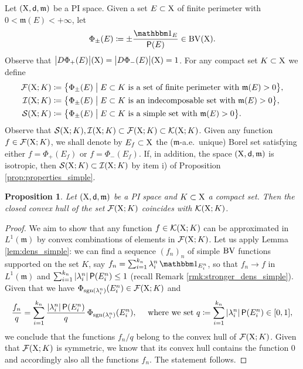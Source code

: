 \documentclass[reqno]{amsart}
\numberwithin{equation}{section}
\newcommand{\X}{{\rm X}}
\newcommand{\sfd}{{\sf d}}
\newcommand{\mm}{\mathfrak m}
\newcommand{\1}{\mathbbm 1}
\newcommand{\BV}{{\rm BV}}
\renewcommand{\P}{{\sf P}}
\newtheorem{proposition}[theorem]{Proposition}
\begin{document}
Let \((\X,\sfd,\mm)\) be a PI space.
Given a set \(E\subset\X\) of finite perimeter with \(0<\mm(E)<+\infty\), let
\[
\Phi_\pm(E)\coloneqq\pm\frac{\1_E}{\P(E)}\in\BV(\X).
\]
Observe that \(\big|D\Phi_+(E)\big|(\X)=\big|D\Phi_-(E)\big|(\X)=1\).
For any compact set \(K\subset\X\) we define
\[\begin{split}
\mathcal F(\X;K)&\coloneqq\big\{\Phi_\pm(E)\;\big|\;E\subset K
\text{ is a set of finite perimeter with }\mm(E)>0\big\},\\
\mathcal I(\X;K)&\coloneqq\big\{\Phi_\pm(E)\;\big|\;E\subset K
\text{ is an indecomposable set with }\mm(E)>0\big\},\\
\mathcal S(\X;K)&\coloneqq\big\{\Phi_\pm(E)\;\big|\;E\subset K
\text{ is a simple set with }\mm(E)>0\big\}.
\end{split}\]
Observe that \(\mathcal S(\X;K),\mathcal I(\X;K)\subset\mathcal F(\X;K)\subset\mathcal K(\X;K)\).
Given any function \(f\in\mathcal F(\X;K)\), we shall denote
by \(E_f\subset\X\) the (\(\mm\)-a.e.\ unique) Borel set satisfying either
\(f=\Phi_+(E_f)\) or \(f=\Phi_-(E_f)\).
If, in addition, the space \((\X,\sfd,\mm)\) is isotropic, then
\(\mathcal S(\X;K)\subset\mathcal I(\X;K)\) by item i) of Proposition
\ref{prop:properties_simple}.
%
%
\begin{proposition}\label{prop:convex_hull_simple}
Let \((\X,\sfd,\mm)\) be a PI space and \(K\subset\X\) a compact set.
Then the closed convex hull of the set \(\mathcal F(\X;K)\) coincides
with \(\mathcal K(\X;K)\).
\end{proposition}
\begin{proof}
We aim to show that any function \(f\in\mathcal K(\X;K)\) can be approximated
in \(L^1(\mm)\) by convex combinations of elements in \(\mathcal F(\X;K)\).
Let us apply Lemma \ref{lem:dens_simple}: we can find a sequence
\((f_n)_n\) of simple \(\BV\) functions supported on the set \(K\), say
\(f_n=\sum_{i=1}^{k_n}\lambda^n_i\,\1_{E^n_i}\), so that \(f_n\to f\) in
\(L^1(\mm)\) and \(\sum_{i=1}^{k_n}|\lambda^n_i|\,\P(E^n_i)\leq 1\)
(recall Remark \ref{rmk:stronger_dens_simple}). Given that we have
\(\Phi_{{\rm sgn}(\lambda^n_i)}(E^n_i)\in\mathcal F(\X;K)\) and
\[
\frac{f_n}{q}=\sum_{i=1}^{k_n}\frac{|\lambda^n_i|\,\P(E^n_i)}{q}
\,\Phi_{{\rm sgn}(\lambda^n_i)}(E^n_i),\quad\text{ where we set }
q\coloneqq\sum_{i=1}^{k_n}|\lambda^n_i|\,\P(E^n_i)\in[0,1],
\]
we conclude that the functions \(f_n/q\) belong to the convex hull of \(\mathcal F(\X;K)\).
Given that \(\mathcal F(\X;K)\) is symmetric, we know that its convex hull contains the
function \(0\) and accordingly also all the functions \(f_n\). The statement follows.
\end{proof}
\end{document}

